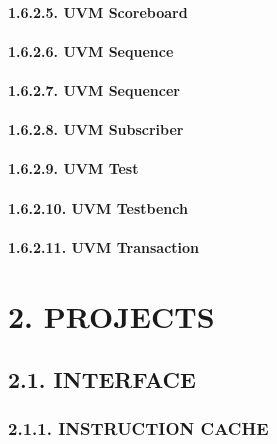 \documentclass[
]{article}
\begin{document}
\hypertarget{uvm-scoreboard-1}{%
\paragraph{1.6.2.5. UVM Scoreboard}\label{uvm-scoreboard-1}}

\hypertarget{uvm-sequence-1}{%
\paragraph{1.6.2.6. UVM Sequence}\label{uvm-sequence-1}}

\hypertarget{uvm-sequencer-1}{%
\paragraph{1.6.2.7. UVM Sequencer}\label{uvm-sequencer-1}}

\hypertarget{uvm-subscriber-1}{%
\paragraph{1.6.2.8. UVM Subscriber}\label{uvm-subscriber-1}}

\hypertarget{uvm-test-1}{%
\paragraph{1.6.2.9. UVM Test}\label{uvm-test-1}}

\hypertarget{uvm-testbench-1}{%
\paragraph{1.6.2.10. UVM Testbench}\label{uvm-testbench-1}}

\hypertarget{uvm-transaction-1}{%
\paragraph{1.6.2.11. UVM Transaction}\label{uvm-transaction-1}}

\hypertarget{projects-1}{%
\section{2. PROJECTS}\label{projects-1}}

\hypertarget{interface-1}{%
\subsection{2.1. INTERFACE}\label{interface-1}}

\hypertarget{instruction-cache-1}{%
\subsubsection{2.1.1. INSTRUCTION CACHE}\label{instruction-cache-1}}
\end{document}
